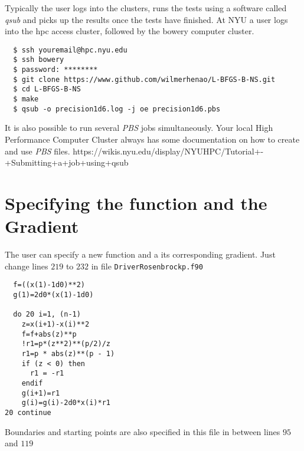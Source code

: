 Typically the user logs into the clusters, runs the tests using a software called \emph{qsub} and picks up the results once the tests have finished. At NYU a user logs into the hpc access cluster, followed by the bowery computer cluster.

\begin{lstlisting}
  $ ssh youremail@hpc.nyu.edu
  $ ssh bowery
  $ password: ********
  $ git clone https://www.github.com/wilmerhenao/L-BFGS-B-NS.git
  $ cd L-BFGS-B-NS
  $ make
  $ qsub -o precision1d6.log -j oe precision1d6.pbs
\end{lstlisting}

It is also possible to run several \emph{PBS} jobs simultaneously. Your local High Performance Computer Cluster always has some documentation on how to create and use \emph{PBS} files. https://wikis.nyu.edu/display/NYUHPC/Tutorial+-+Submitting+a+job+using+qsub

\section{Specifying the function and the Gradient}

The user can specify a new function and a its corresponding gradient. Just change lines $219$ to $232$ in file \texttt{DriverRosenbrockp.f90} 


\begin{lstlisting}
  f=((x(1)-1d0)**2)
  g(1)=2d0*(x(1)-1d0)
  
  do 20 i=1, (n-1)
    z=x(i+1)-x(i)**2
    f=f+abs(z)**p
    !r1=p*(z**2)**(p/2)/z
    r1=p * abs(z)**(p - 1)
    if (z < 0) then
      r1 = -r1
    endif
    g(i+1)=r1
    g(i)=g(i)-2d0*x(i)*r1
20 continue
\end{lstlisting}

Boundaries and starting points are also specified in this file in between lines $95$ and $119$
